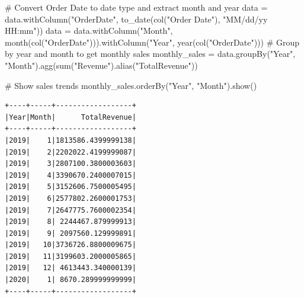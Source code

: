 \documentclass[
  letterpaper,
  DIV=11,
  numbers=noendperiod]{scrartcl}
\newenvironment{Shaded}{\begin{snugshade}}{\end{snugshade}}
\newcommand{\BuiltInTok}[1]{\textcolor[rgb]{0.00,0.23,0.31}{#1}}
\newcommand{\CommentTok}[1]{\textcolor[rgb]{0.37,0.37,0.37}{#1}}
\newcommand{\NormalTok}[1]{\textcolor[rgb]{0.00,0.23,0.31}{#1}}
\newcommand{\OperatorTok}[1]{\textcolor[rgb]{0.37,0.37,0.37}{#1}}
\newcommand{\StringTok}[1]{\textcolor[rgb]{0.13,0.47,0.30}{#1}}
\begin{document}
\begin{Shaded}
\begin{Highlighting}[]
\CommentTok{\# Convert Order Date to date type and extract month and year}
\NormalTok{data }\OperatorTok{=}\NormalTok{ data.withColumn(}\StringTok{"OrderDate"}\NormalTok{, to\_date(col(}\StringTok{"Order Date"}\NormalTok{), }\StringTok{"MM/dd/yy HH:mm"}\NormalTok{))}
\NormalTok{data }\OperatorTok{=}\NormalTok{ data.withColumn(}\StringTok{"Month"}\NormalTok{, month(col(}\StringTok{"OrderDate"}\NormalTok{))).withColumn(}\StringTok{"Year"}\NormalTok{, year(col(}\StringTok{"OrderDate"}\NormalTok{)))}
\CommentTok{\# Group by year and month to get monthly sales}
\NormalTok{monthly\_sales }\OperatorTok{=}\NormalTok{ data.groupBy(}\StringTok{"Year"}\NormalTok{, }\StringTok{"Month"}\NormalTok{).agg(}\BuiltInTok{sum}\NormalTok{(}\StringTok{"Revenue"}\NormalTok{).alias(}\StringTok{"TotalRevenue"}\NormalTok{))}

\CommentTok{\# Show sales trends}
\NormalTok{monthly\_sales.orderBy(}\StringTok{"Year"}\NormalTok{, }\StringTok{"Month"}\NormalTok{).show()}
\end{Highlighting}
\end{Shaded}

\begin{verbatim}
+----+-----+------------------+
|Year|Month|      TotalRevenue|
+----+-----+------------------+
|2019|    1|1813586.4399999138|
|2019|    2|2202022.4199999087|
|2019|    3|2807100.3800003603|
|2019|    4|3390670.2400007015|
|2019|    5|3152606.7500005495|
|2019|    6|2577802.2600001753|
|2019|    7|2647775.7600002354|
|2019|    8| 2244467.879999913|
|2019|    9| 2097560.129999891|
|2019|   10|3736726.8800009675|
|2019|   11|3199603.2000005865|
|2019|   12| 4613443.340000139|
|2020|    1| 8670.289999999999|
+----+-----+------------------+
\end{verbatim}
\end{document}
